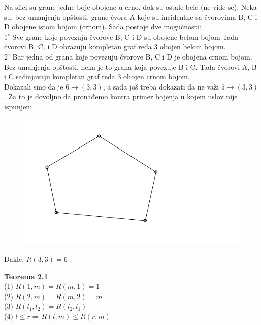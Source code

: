 \documentclass[12pt,a4paper]{article}
\begin{document}
	\noindent Na slici su grane jedne boje obojene u crno, dok su ostale bele (ne vide se).
	Neka su, bez umanjenja opštosti, grane čvora A koje su incidentne sa čvorovima B, C i D obojene istom bojom (crnom). Sada postoje dve mogućnosti: 
	\vspace{1em}
	\\
	$1^\circ$ Sve grane koje povezuju čvorove B, C i D su obojene belom bojom Tada čvorovi B, C, i D obrazuju kompletan graf reda 3 obojen belom bojom.
	\vspace{0.5em}
	\\
	$2^\circ$ Bar jedna od grana koje povezuju čvorove B, C i D je obojena crnom bojom. Bez umanjenja opštosti, neka je to grana koja povezuje B i C. Tada čvorovi A, B i C sačinjavaju kompletan graf reda 3 obojen crnom bojom.
	\vspace{0.5em}
	\\Dokazali smo da je $6 \rightarrow (3, 3)$, a sada još treba dokazati da ne važi $5 \rightarrow (3, 3)$. Za to je dovoljno da pronađemo kontra primer bojenja u kojem uslov nije ispunjen:
	\begin{figure}[h]
	\centering
	\includegraphics[scale=1.1]{r33kp.png}
	\end{figure}
	
	Dakle, $R(3,3)=6$ .	
	
	\vspace{1em}	
	
	{\noindent\fontsize{12pt}{12pt}\textbf{Teorema 2.1}}
	\vspace{0.5em}	
	\\
	(1) {} {} $R(1, m) = R(m, 1) = 1$\\
	(2) {} {} $R(2, m) = R(m, 2) = m$\\
	(3) {} {} $R(l_{1}, l_{2}) = R(l_{2}, l_{1})$\\
	(4) {} {} $l \leq r \Rightarrow R(l, m) \leq R(r, m)$\\
	
\end{document}
